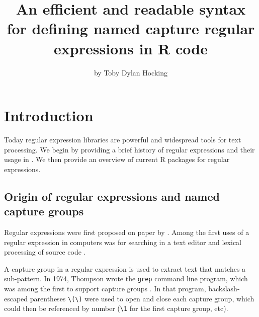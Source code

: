 \title{An efficient and readable syntax for defining named capture
  regular expressions in R code}

\author{by Toby Dylan Hocking}

\maketitle

\section{Introduction}

Today regular expression libraries are powerful and widespread tools
for text processing. We begin by providing a brief history of regular
expressions and their usage in \R. We then provide an overview of
current R packages for regular expressions.

\subsection{Origin of regular expressions and named capture groups}

Regular expressions were first proposed on paper
by \citet{Kleene56}. Among the first uses of a regular expression in
computers was for searching in a text editor \citep{Thompson68} and
lexical processing of source code \citep{Johnson68}. 

A capture group in a regular expression is used to extract text that
matches a sub-pattern. In 1974, Thompson wrote the \texttt{grep}
command line program, which was among the first to support capture
groups \citep{Friedl2002}. In that program, backslash-escaped
parentheses \verb|\(\)| were used to open and close each capture
group, which could then be referenced by number (\verb|\1| for the
first capture group, etc).

